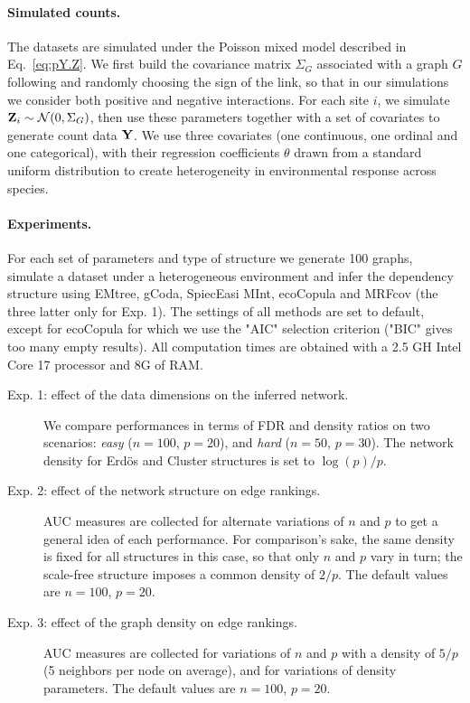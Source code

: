 \paragraph{Simulated counts.}
The datasets are simulated under the Poisson mixed model described in Eq.~\eqref{eq:pY.Z}. We first build the covariance matrix $\Sigma_G$ associated with a graph $G$ following \citet{huge} and randomly choosing the sign of the link, so that in our simulations we consider both positive and negative interactions. For each site $i$, we simulate ${\bf Z}_i \sim \mathcal{N}(0,\Sigma_G)$, then use these parameters together with a set of covariates to generate count data ${\bf Y}$. We use three covariates (one continuous, one ordinal and one categorical), with their regression coefficients $\theta$ drawn from a standard uniform distribution to create heterogeneity in environmental response across species.

\paragraph{Experiments.}
For each set of parameters and type of structure we generate 100 graphs, simulate a dataset under a heterogeneous environment and infer the dependency structure using EMtree, gCoda, SpiecEasi MInt, ecoCopula and MRFcov (the three latter only for Exp. 1). 
The settings of all methods are set to default, except for ecoCopula for which we use the "AIC" selection criterion ("BIC" gives too many empty results).
All computation times are obtained with a 2.5 GH Intel Core 17 processor and 8G of RAM.

\begin{description}
\item[Exp. 1: effect of the data dimensions on the inferred network.] We compare performances in terms of FDR and density ratios on two scenarios: \textit{easy} ($n=100$, $p=20$), and \textit{hard} ($n=50$, $p=30$). The network density for Erdös and Cluster structures is set to $\log(p)/p$.
\item[Exp. 2: effect of the network structure on edge rankings.] AUC measures are collected for alternate variations of $n$ and $p$ to get a general idea of each performance. For comparison's sake, the same density is fixed for all structures in this case,  so that only $n$ and $p$ vary in turn; the scale-free structure imposes a common density of $2/p$. The default values are $n=100$, $p=20$. 
\item[Exp. 3:  effect of the graph density on edge rankings.] AUC measures are collected for variations of $n$ and $p$ with a density of $5/p$ (5 neighbors per node on average), and for variations of density parameters. The default values are $n=100$, $p=20$.
\end{description}


